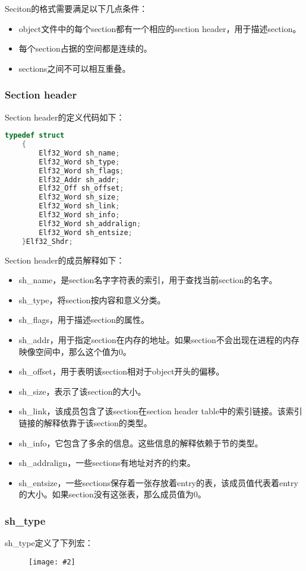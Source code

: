 \documentclass[a4paper,left=2.5cm,right=2.5cm,11pt]{article}
\newcommand{\sizedfic}[2]{\begin{figure}[H]
		\center
		\texttt{[image: \#2]}
	\end{figure}}
\begin{document}
	Seciton的格式需要满足以下几点条件：
	\begin{itemize}
		\item object文件中的每个section都有一个相应的section header，用于描述section。
		\item 每个section占据的空间都是连续的。
		\item sections之间不可以相互重叠。
	\end{itemize}

\subsubsection{Section header}
	Section header的定义代码如下：
	\begin{lstlisting}[language = C]
	typedef struct
	{
		Elf32_Word sh_name;
		Elf32_Word sh_type;
		Elf32_Word sh_flags;
		Elf32_Addr sh_addr;
		Elf32_Off sh_offset;
		Elf32_Word sh_size;
		Elf32_Word sh_link;
		Elf32_Word sh_info;
		Elf32_Word sh_addralign;
		Elf32_Word sh_entsize;
	}Elf32_Shdr;
	\end{lstlisting}

	Section header的成员解释如下：
	\begin{itemize}
		\item sh\_name，是section名字字符表的索引，用于查找当前section的名字。
		\item sh\_type，将section按内容和意义分类。
		\item sh\_flags，用于描述section的属性。
		\item sh\_addr，用于指定section在内存的地址。如果section不会出现在进程的内存映像空间中，那么这个值为0。
		\item sh\_offset，用于表明该section相对于object开头的偏移。
		\item sh\_size，表示了该section的大小。
		\item sh\_link，该成员包含了该section在section header table中的索引链接。该索引链接的解释依靠于该section的类型。
		\item sh\_info，它包含了多余的信息。这些信息的解释依赖于节的类型。
		\item sh\_addralign，一些sections有地址对齐的约束。
		\item sh\_entsize，一些sections保存着一张存放着entry的表，该成员值代表着entry的大小。如果section没有这张表，那么成员值为0。
	\end{itemize}

\subsubsection{sh\_type}
	sh\_type定义了下列宏：
	\sizedfic{0.4}{16.png}
\end{document}
